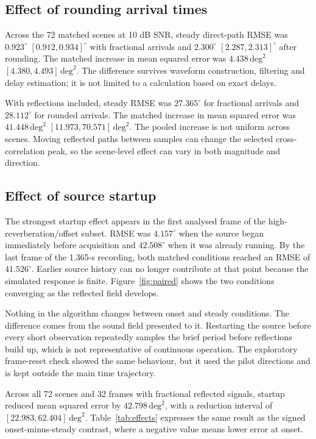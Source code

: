 \documentclass{edpsci}
\begin{document}
\subsection{Effect of rounding arrival times}

Across the 72 matched scenes at 10 dB SNR, steady direct-path RMSE was $0.923^\circ$ $[0.912,0.934]^\circ$ with fractional arrivals and $2.300^\circ$ $[2.287,2.313]^\circ$ after rounding. The matched increase in mean squared error was $4.438\,\mathrm{deg}^2$ $[4.380,4.493]\,\mathrm{deg}^2$. The difference survives waveform construction, filtering and delay estimation; it is not limited to a calculation based on exact delays.

With reflections included, steady RMSE was $27.365^\circ$ for fractional arrivals and $28.112^\circ$ for rounded arrivals. The matched increase in mean squared error was $41.448\,\mathrm{deg}^2$ $[11.973,70.571]\,\mathrm{deg}^2$. The pooled increase is not uniform across scenes. Moving reflected paths between samples can change the selected cross-correlation peak, so the scene-level effect can vary in both magnitude and direction.

\subsection{Effect of source startup}

The strongest startup effect appears in the first analysed frame of the high-reverberation/offset subset. RMSE was $4.157^\circ$ when the source began immediately before acquisition and $42.508^\circ$ when it was already running. By the last frame of the 1.365-s recording, both matched conditions reached an RMSE of $41.526^\circ$. Earlier source history can no longer contribute at that point because the simulated response is finite. Figure~\ref{fig:paired} shows the two conditions converging as the reflected field develops.

Nothing in the algorithm changes between onset and steady conditions. The difference comes from the sound field presented to it. Restarting the source before every short observation repeatedly samples the brief period before reflections build up, which is not representative of continuous operation. The exploratory frame-reset check showed the same behaviour, but it used the pilot directions and is kept outside the main time trajectory.

Across all 72 scenes and 32 frames with fractional reflected signals, startup reduced mean squared error by $42.798\,\mathrm{deg}^2$, with a reduction interval of $[22.983,62.404]\,\mathrm{deg}^2$. Table~\ref{tab:effects} expresses the same result as the signed onset-minus-steady contrast, where a negative value means lower error at onset.
\end{document}
